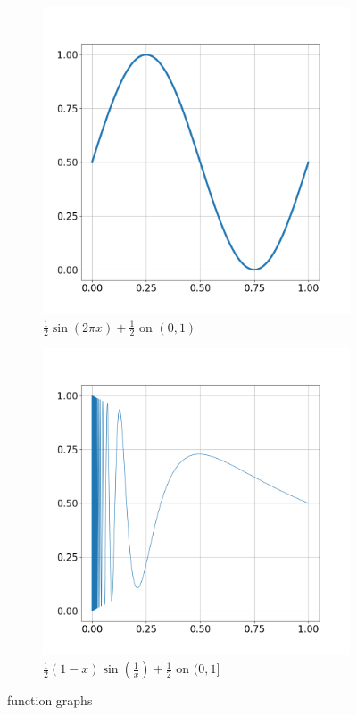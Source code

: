 \documentclass[12pt]{article}
\theoremstyle{definition}
\theoremstyle{exercise}
\theoremstyle{solution}
\begin{document}
\begin{figure}[t]
    \centering
    \begin{subfigure}{.5\textwidth}
      \centering
      \includegraphics[width=\linewidth]{UA_Section_4_4_Figure_1.png}
      \caption{\( \tfrac{1}{2} \sin (2 \pi x) + \tfrac{1}{2} \) on \( (0, 1) \)}
      \label{fig:1sub1}
    \end{subfigure}%
    \begin{subfigure}{.5\textwidth}
      \centering

      \includegraphics[width=\linewidth]{UA_Section_4_4_Figure_2.png}
      \caption{\( \tfrac{1}{2} (1 - x) \sin \left( \tfrac{1}{x} \right) + \tfrac{1}{2} \) on \( (0, 1] \)}
      \label{fig:1sub2}
    \end{subfigure}
    \caption{ function graphs}
    \label{fig:1}
\end{figure}
\end{document}
